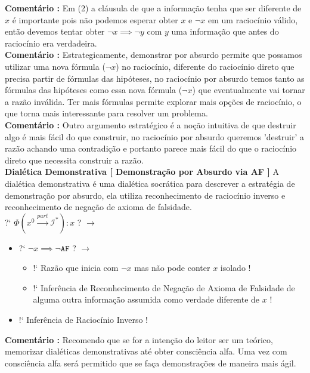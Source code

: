 \documentclass[10pt,a4paper]{report}
\begin{document}
\textbf{Comentário :} Em (2) a cláusula de que a informação tenha que ser diferente de $x$ é importante pois não podemos esperar obter $x$ e $\neg x$ em um raciocínio válido, então devemos tentar obter $\neg x \implies \neg y$ com $y$ uma informação que antes do raciocínio era verdadeira.\\

\textbf{Comentário :} Estrategicamente, demonstrar por absurdo permite que possamos utilizar uma nova fórmula ($\neg x$) no raciocínio, diferente do raciocínio direto que precisa partir de fórmulas das hipóteses, no raciocínio por absurdo temos tanto as fórmulas das hipóteses como essa nova fórmula ($\neg x$) que eventualmente vai tornar a razão inválida. Ter mais fórmulas permite explorar mais opções de raciocínio, o que torna mais interessante para resolver um problema. \\

\textbf{Comentário :} Outro argumento estratégico é a noção intuitiva de que destruir algo é mais fácil do que construir, no raciocínio por absurdo queremos 'destruir' a razão achando uma contradição e portanto parece mais fácil do que o raciocínio direto que necessita construir a razão. \\

\textbf{Dialética Demonstrativa [ Demonstração por Absurdo via AF ]} A dialética demonstrativa é uma dialética socrática para descrever a estratégia de demonstração por absurdo, ela utiliza reconhecimento de raciocínio inverso e reconhecimento de negação de axioma de falsidade. \\

?` $\Phi( x^0 \overset{part}{\rightarrow} \mathcal{I}^* ) : x $  ? $\rightarrow$

\begin{itemize}
	\item[ ] ?` $ \neg x \implies \neg \texttt{AF} $ ? $\rightarrow$
	\begin{itemize}
		\item[ (1) ] !` Razão que inicia com $\neg x$ mas não pode conter $x$ isolado !
		\item[ (2) ] !` Inferência de Reconhecimento de Negação de Axioma de Falsidade de alguma outra informação assumida como verdade diferente de $x$ !
	\end{itemize}
	\item[ ] !` Inferência de Raciocínio Inverso !
\end{itemize}


\textbf{Comentário :} Recomendo que se for a intenção do leitor ser um teórico, memorizar dialéticas demonstrativas até obter consciência alfa. Uma vez com consciência alfa será permitido que se faça demonstrações de maneira mais ágil.\\
\end{document}
